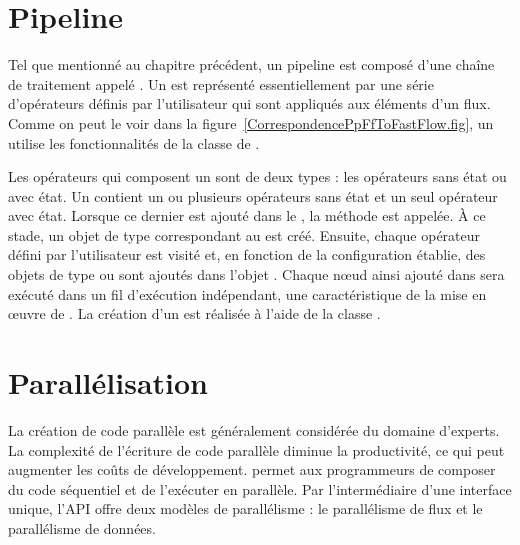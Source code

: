 


\section{Pipeline}

Tel que mentionn\'e au chapitre pr\'ec\'edent, un pipeline est compos\'e d'une cha\^ine de traitement appel\'e . Un  est repr\'esent\'e essentiellement par une s\'erie d'op\'erateurs d\'efinis par l'utilisateur qui sont appliqu\'es aux \'el\'ements d'un flux. Comme on peut le voir dans la figure~\ref{CorrespondencePpFfToFastFlow.fig}, un  utilise les fonctionnalit\'es de la classe  de . 

Les op\'erateurs qui composent un  sont de deux types : les op\'erateurs sans \'etat ou avec \'etat. Un  contient un ou plusieurs op\'erateurs sans \'etat et un seul op\'erateur avec \'etat. Lorsque ce dernier est ajout\'e dans le , la m\'ethode  est appel\'ee. \`A ce stade, un objet de type  correspondant au  est cr\'e\'e. Ensuite, chaque op\'erateur d\'efini par l'utilisateur est visit\'e et, en fonction de la configuration \'etablie, des objets de type  ou  sont ajout\'es dans l'objet . Chaque nœud ainsi ajout\'e dans  sera ex\'ecut\'e dans un fil d'ex\'ecution ind\'ependant, une caract\'eristique de la mise en \oe{}uvre de .
La cr\'eation d'un  est r\'ealis\'ee \`a l'aide de la classe .


\section{Parall\'elisation}

La cr\'eation de code parall\`ele est g\'en\'eralement consid\'er\'ee du domaine d'experts. La complexit\'e de l'\'ecriture de code parall\`ele diminue la productivit\'e, ce qui peut augmenter les co\^uts de d\'eveloppement.  permet aux programmeurs de composer du code s\'equentiel et de l'ex\'ecuter en parall\`ele. Par l'interm\'ediaire d'une interface unique, l'API offre deux mod\`eles de parall\'elisme : le parall\'elisme de flux et le parall\'elisme de donn\'ees.

